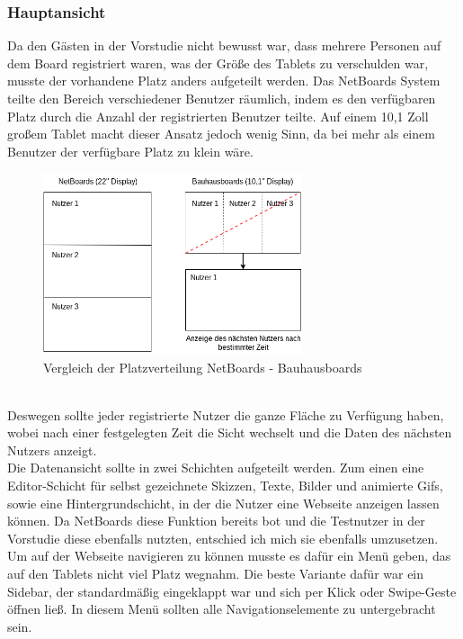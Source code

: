 \subsubsection{Hauptansicht}\label{Hauptansicht}
Da den Gästen in der Vorstudie nicht bewusst war, dass mehrere Personen auf dem Board registriert waren, was der Größe des Tablets zu verschulden war, musste der vorhandene Platz anders aufgeteilt werden. Das NetBoards System teilte den Bereich verschiedener Benutzer räumlich, indem es den verfügbaren Platz durch die Anzahl der registrierten Benutzer teilte.
Auf einem 10,1 Zoll großem Tablet macht dieser Ansatz jedoch wenig Sinn, da bei mehr als einem Benutzer der verfügbare Platz zu klein wäre.
\begin{figure}[h!]
  \centering
    \includegraphics[width=0.68\textwidth]{./img/AufteilungMainView.png}
  \caption{Vergleich der Platzverteilung NetBoards - Bauhausboards}
  \label{img:aufteilungMainView}
\end{figure}
\\
Deswegen sollte jeder registrierte Nutzer die ganze Fläche zu Verfügung haben, wobei nach einer festgelegten Zeit die Sicht wechselt und die Daten des nächsten Nutzers anzeigt.
\\
Die Datenansicht sollte in zwei Schichten aufgeteilt werden. Zum einen eine Editor-Schicht für selbst gezeichnete Skizzen, Texte, Bilder und animierte Gifs, sowie eine Hintergrundschicht, in der die Nutzer eine Webseite anzeigen lassen können. Da NetBoards diese Funktion bereits bot und die Testnutzer in der Vorstudie diese ebenfalls nutzten, entschied ich mich sie ebenfalls umzusetzen.
\\
Um auf der Webseite navigieren zu können musste es dafür ein Menü geben, das auf den Tablets nicht viel Platz wegnahm. Die beste Variante dafür war ein Sidebar, der standardmäßig eingeklappt war und sich per Klick oder Swipe-Geste öffnen ließ.
In diesem Menü sollten alle Navigationselemente zu untergebracht sein. 
